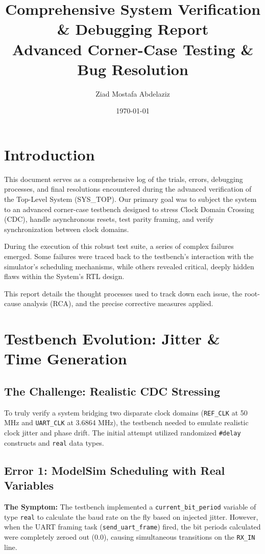 \documentclass[11pt,a4paper]{article}
\title{\textbf{Comprehensive System Verification \& Debugging Report} \\
\large Advanced Corner-Case Testing \& Bug Resolution}
\author{Ziad Mostafa Abdelaziz}
\date{\today}
\begin{document}
\maketitle
\tableofcontents
\newpage

\section{Introduction}
This document serves as a comprehensive log of the trials, errors, debugging processes, and final resolutions encountered during the advanced verification of the Top-Level System (SYS\_TOP). Our primary goal was to subject the system to an advanced corner-case testbench designed to stress Clock Domain Crossing (CDC), handle asynchronous resets, test parity framing, and verify synchronization between clock domains.

During the execution of this robust test suite, a series of complex failures emerged. Some failures were traced back to the testbench's interaction with the simulator's scheduling mechanisms, while others revealed critical, deeply hidden flaws within the System's RTL design.

This report details the thought processes used to track down each issue, the root-cause analysis (RCA), and the precise corrective measures applied.

\section{Testbench Evolution: Jitter \& Time Generation}

\subsection{The Challenge: Realistic CDC Stressing}
To truly verify a system bridging two disparate clock domains (\texttt{REF\_CLK} at 50 MHz and \texttt{UART\_CLK} at 3.6864 MHz), the testbench needed to emulate realistic clock jitter and phase drift. The initial attempt utilized randomized \texttt{\#delay} constructs and \texttt{real} data types.

\subsection{Error 1: ModelSim Scheduling with Real Variables}
\textbf{The Symptom:}
The testbench implemented a \texttt{current\_bit\_period} variable of type \texttt{real} to calculate the baud rate on the fly based on injected jitter. However, when the UART framing task (\texttt{send\_uart\_frame}) fired, the bit periods calculated were completely zeroed out ($0.0$), causing simultaneous transitions on the \texttt{RX\_IN} line.
\end{document}
